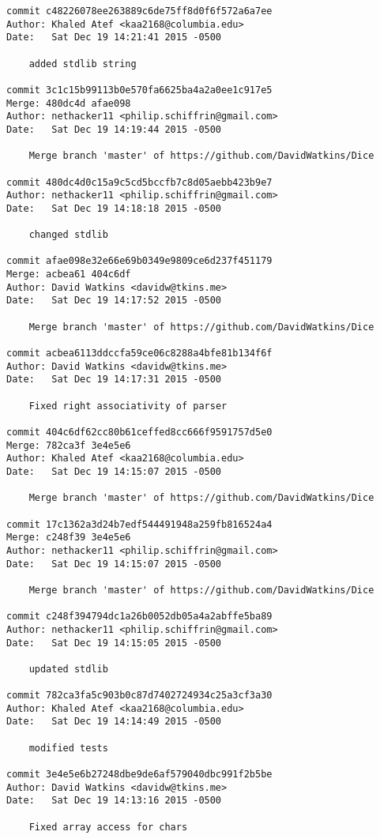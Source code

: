 \begin{verbatim}
commit c48226078ee263889c6de75ff8d0f6f572a6a7ee
Author: Khaled Atef <kaa2168@columbia.edu>
Date:   Sat Dec 19 14:21:41 2015 -0500

    added stdlib string

commit 3c1c15b99113b0e570fa6625ba4a2a0ee1c917e5
Merge: 480dc4d afae098
Author: nethacker11 <philip.schiffrin@gmail.com>
Date:   Sat Dec 19 14:19:44 2015 -0500

    Merge branch 'master' of https://github.com/DavidWatkins/Dice

commit 480dc4d0c15a9c5cd5bccfb7c8d05aebb423b9e7
Author: nethacker11 <philip.schiffrin@gmail.com>
Date:   Sat Dec 19 14:18:18 2015 -0500

    changed stdlib

commit afae098e32e66e69b0349e9809ce6d237f451179
Merge: acbea61 404c6df
Author: David Watkins <davidw@tkins.me>
Date:   Sat Dec 19 14:17:52 2015 -0500

    Merge branch 'master' of https://github.com/DavidWatkins/Dice

commit acbea6113ddccfa59ce06c8288a4bfe81b134f6f
Author: David Watkins <davidw@tkins.me>
Date:   Sat Dec 19 14:17:31 2015 -0500

    Fixed right associativity of parser

commit 404c6df62cc80b61ceffed8cc666f9591757d5e0
Merge: 782ca3f 3e4e5e6
Author: Khaled Atef <kaa2168@columbia.edu>
Date:   Sat Dec 19 14:15:07 2015 -0500

    Merge branch 'master' of https://github.com/DavidWatkins/Dice

commit 17c1362a3d24b7edf544491948a259fb816524a4
Merge: c248f39 3e4e5e6
Author: nethacker11 <philip.schiffrin@gmail.com>
Date:   Sat Dec 19 14:15:07 2015 -0500

    Merge branch 'master' of https://github.com/DavidWatkins/Dice

commit c248f394794dc1a26b0052db05a4a2abffe5ba89
Author: nethacker11 <philip.schiffrin@gmail.com>
Date:   Sat Dec 19 14:15:05 2015 -0500

    updated stdlib

commit 782ca3fa5c903b0c87d7402724934c25a3cf3a30
Author: Khaled Atef <kaa2168@columbia.edu>
Date:   Sat Dec 19 14:14:49 2015 -0500

    modified tests

commit 3e4e5e6b27248dbe9de6af579040dbc991f2b5be
Author: David Watkins <davidw@tkins.me>
Date:   Sat Dec 19 14:13:16 2015 -0500

    Fixed array access for chars


\end{verbatim}
